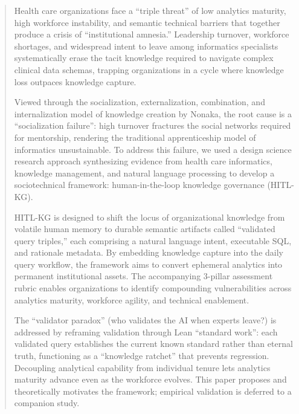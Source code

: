\documentclass[
  american,
  11pt,
  letterpaper,
  oneside  ,captions=tableheading
]{scrartcl}
\begin{document}
\begin{abstract}
Health care organizations face a ``triple threat'' of low analytics
maturity, high workforce instability, and semantic technical barriers
that together produce a crisis of ``institutional amnesia.'' Leadership
turnover, workforce shortages, and widespread intent to leave among
informatics specialists systematically erase the tacit knowledge
required to navigate complex clinical data schemas, trapping
organizations in a cycle where knowledge loss outpaces knowledge
capture.

Viewed through the socialization, externalization, combination, and
internalization model of knowledge creation by Nonaka, the root cause is
a ``socialization failure'': high turnover fractures the social networks
required for mentorship, rendering the traditional apprenticeship model
of informatics unsustainable. To address this failure, we used a design
science research approach synthesizing evidence from health care
informatics, knowledge management, and natural language processing to
develop a sociotechnical framework: human-in-the-loop knowledge
governance (HITL-KG).

HITL-KG is designed to shift the locus of organizational knowledge from
volatile human memory to durable semantic artifacts called ``validated
query triples,'' each comprising a natural language intent, executable
SQL, and rationale metadata. By embedding knowledge capture into the
daily query workflow, the framework aims to convert ephemeral analytics
into permanent institutional assets. The accompanying 3-pillar
assessment rubric enables organizations to identify compounding
vulnerabilities across analytics maturity, workforce agility, and
technical enablement.

The ``validator paradox'' (who validates the AI when experts leave?) is
addressed by reframing validation through Lean ``standard work'': each
validated query establishes the current known standard rather than
eternal truth, functioning as a ``knowledge ratchet'' that prevents
regression. Decoupling analytical capability from individual tenure lets
analytics maturity advance even as the workforce evolves. This paper
proposes and theoretically motivates the framework; empirical validation
is deferred to a companion study.
\end{abstract}
\end{document}
